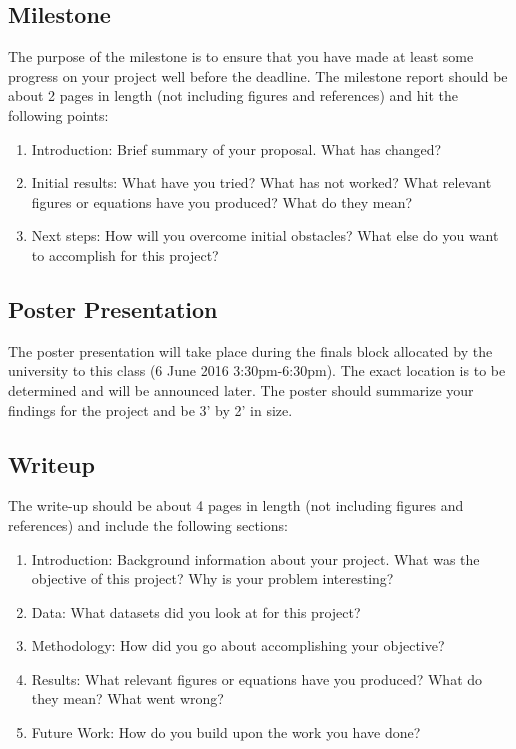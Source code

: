 \documentclass[11pt,onecolumn]{article}
\begin{document}
\subsection{Milestone}
The purpose of the milestone is to ensure that you have made at least some progress on your project well before the deadline.  The milestone report should be about 2 pages in length (not including figures and references) and hit the following points:
\begin{enumerate}
	\item Introduction: Brief summary of your proposal. What has changed? 
	\item Initial results: What have you tried? What has not worked? What relevant figures or equations have you produced? What do they mean?
	\item Next steps: How will you overcome initial obstacles? What else do you want to accomplish for this project?
\end{enumerate}

\subsection{Poster Presentation}
The poster presentation will take place during the finals block allocated by the university to this class (6 June 2016 3:30pm-6:30pm). The exact location is to be determined and will be announced later. The poster should summarize your findings for the project and be 3' by 2' in size.

\subsection{Writeup}
The write-up should be about 4 pages in length (not including figures and references) and include the following sections:
\begin{enumerate}
	\item Introduction: Background information about your project. What was the objective of this project? Why is your problem interesting?
	\item Data: What datasets did you look at for this project? 
	\item Methodology: How did you go about accomplishing your objective? 
	\item Results: What relevant figures or equations have you produced? What do they mean? What went wrong?
	\item Future Work: How do you build upon the work you have done?
\end{enumerate}
\end{document}
